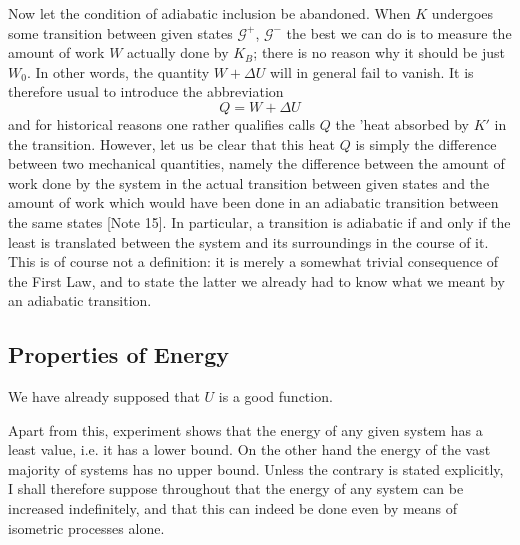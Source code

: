 \documentclass{article}
\theoremstyle{definition}
\begin{document}
Now let the condition of adiabatic inclusion be abandoned. When \(K\) undergoes some transition between given states \(\mathcal{G}^+\), \(\mathcal{G}^-\) the best we can do is to measure the amount of work \(W\) actually done by \(K_B\); there is no reason why it should be just \(W_0\). In other words, the quantity \(W + \Delta U\) will in general fail to vanish. It is therefore usual to introduce the abbreviation
\[Q = W + \Delta U \]
and for historical reasons one rather qualifies calls \(Q\) the 'heat absorbed by \(K'\) in the transition. However, let us be clear that this heat \(Q\) is simply the difference between two mechanical quantities, namely the difference between the amount of work done by the system in the actual transition between given states and the amount of work which would have been done in an adiabatic transition between the same states [Note 15]. In particular, a transition is adiabatic if and only if the least is translated between the system and its surroundings in the course of it. This is of course not a definition: it is merely a somewhat trivial consequence of the First Law, and to state the latter we already had to know what we meant by an adiabatic transition.

\subsection{Properties of Energy}
We have already supposed that \(U\) is a good function.

\normalfont

Apart from this, experiment shows that the energy of any given system has a least value, i.e. it has a lower bound. On the other hand the energy of the vast majority of systems has no upper bound. Unless the contrary is stated explicitly, I shall therefore suppose throughout that the energy of any system can be increased indefinitely, and that this can indeed be done even by means of isometric processes alone.
\end{document}
